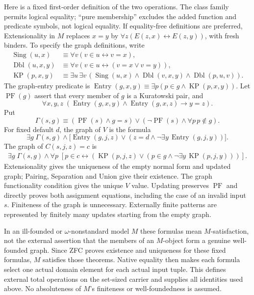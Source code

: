 \documentclass[11pt]{article}
\begin{document}
Here is a fixed first-order definition of the two operations.  The class
family permits logical equality; ``pure membership'' excludes the added
function and predicate symbols, not logical equality.  If equality-free
definitions are preferred, Extensionality in $M$ replaces $x=y$ by
$\forall z(E(z,x)\leftrightarrow E(z,y))$, with fresh binders.
To specify the graph definitions, write
\begin{align*}
 \operatorname{Sing}(u,x)&\equiv\forall v(v\in u\leftrightarrow v=x),\\
 \operatorname{Dbl}(u,x,y)&\equiv\forall v(v\in u\leftrightarrow(v=x\lor v=y)),\\
 \operatorname{KP}(p,x,y)&\equiv
 \exists u\,\exists v\,
 (\operatorname{Sing}(u,x)\land\operatorname{Dbl}(v,x,y)
 \land\operatorname{Dbl}(p,u,v)).
\end{align*}
The graph-entry predicate is
$\operatorname{Entry}(g,x,y)\equiv\exists p(p\in g\land\operatorname{KP}(p,x,y))$.
Let $\operatorname{PF}(g)$ assert that every member of $g$ is a Kuratowski
pair, and
\[
 \forall x,y,z\;
  (\operatorname{Entry}(g,x,y)\land\operatorname{Entry}(g,x,z)\to y=z).
\]
Put
\[
 \Gamma(s,g)\equiv
 (\operatorname{PF}(s)\land g=s)\lor
 (\neg\operatorname{PF}(s)\land\forall p\,p\notin g).
\]
For fixed default $d$, the graph of $V$ is the formula
\[
 \exists g\;\Gamma(s,g)\land
 \bigl[\operatorname{Entry}(g,j,z)\lor
  (z=d\land\neg\exists y\,\operatorname{Entry}(g,j,y))\bigr].
\]
The graph of $C(s,j,z)=c$ is
\begin{align*}
 \exists g\;\Gamma(s,g)\land\forall p\;[p\in c\leftrightarrow
  (\operatorname{KP}(p,j,z)\lor
   (p\in g\land\neg\exists y\,\operatorname{KP}(p,j,y)))].
\end{align*}
Extensionality gives the uniqueness of the empty normal form and updated
graph; Pairing, Separation and Union give their existence.  The graph
functionality condition gives the unique $V$ value.  Updating preserves
$\operatorname{PF}$ and directly proves both assignment equations,
including the case of an invalid input $s$.  Finiteness of the graph is
unnecessary.  Externally finite patterns are represented by finitely many
updates starting from the empty graph.

In an ill-founded or $\omega$-nonstandard model $M$ these formulas mean
$M$-satisfaction, not the external assertion that the members of an
$M$-object form a genuine well-founded graph.  Since ZFC proves existence
and uniqueness for these fixed formulas, $M$ satisfies those theorems.
Native equality then makes each formula select one actual domain element
for each actual input tuple.  This defines external total operations on
the set-sized carrier and supplies all identities used above.  No
absoluteness of $M$'s finiteness or well-foundedness is assumed.
\end{document}
